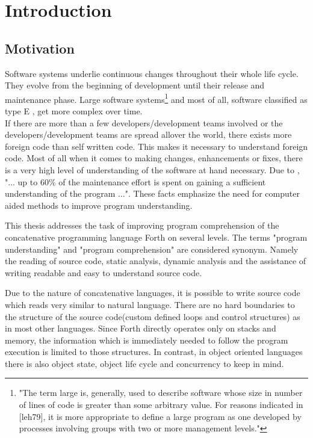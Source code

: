 \chapter{Introduction}

\section*{Motivation}

Software systems underlie continuous changes throughout their whole life cycle.
They evolve from the beginning of development until their release and maintenance phase. Large software systems\footnote{"The term large is, generally, used to describe software whose size in number of lines of code is greater than some arbitrary value. For reasons indicated in [leh79], it is more appropriate to define a large program as one developed by processes involving groups with two or more management levels."\cite{Lehman:2003:SEB:950401.950407}} and most of all, software  classified as type E \cite{Cook:2006:ESS:1115566.1115567}, get more complex over time.\\
If there are more than a few developers/development teams involved or the developers/development teams are spread allover the world, there exists more foreign code than self written code. This makes it necessary to understand foreign code.
Most of all when it comes to making changes, enhancements or fixes, there is a very high level of understanding of the software at hand necessary\cite{Boehm:1976:SE:1311958.1312684}\cite{Singer97anexamination}. Due to \cite{Cornelissen:2009:SSP:1638616.1639301}, "... up to 60\% of the maintenance effort is spent on gaining a sufficient understanding of the program ...". These facts emphasize the need for computer aided methods to improve program understanding.

This thesis addresses the task of improving program comprehension of the concatenative programming language Forth on several levels. The terms "program understanding" and "program comprehension" are considered synonym. Namely the reading of source code, static analysis, dynamic analysis and the assistance of writing readable and easy to understand source code.

Due to the nature of concatenative languages, it is possible to write source code which reads very similar to natural language. There are no hard boundaries to the structure of the source code(custom defined loops and control structures) as in most other languages. Since Forth directly operates only on stacks and memory, the information which is immediately needed to follow the program execution is limited to those structures. In contrast, in object oriented languages there is also object state, object life cycle and concurrency to keep in mind.

